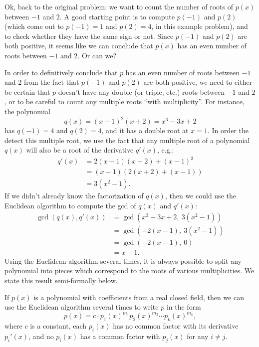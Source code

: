 Ok, back to the original problem: we want to count the number of roots of $p(x)$ between $-1$ and $2$. A good starting point is to compute $p(-1)$ and $p(2)$ (which come out to $p(-1) = 1$ and $p(2) = 4$, in this example problem), and to check whether they have the same sign or not. Since $p(-1)$ and $p(2)$ are both positive, it seems like we can conclude that $p(x)$ has an even number of roots between $-1$ and $2$. Or can we?

In order to definitively conclude that $p$ has an even number of roots between $-1$ and $2$ from the fact that $p(-1)$ and $p(2)$ are both positive, we need to either be certain that $p$ doesn't have any double (or triple, etc.) roots between $-1$ and $2$, or to be careful to count any multiple roots ``with multiplicity''. For instance, the polynomial
\[
q(x) = (x - 1)^2(x+2) = x^3 - 3x + 2
\]
has $q(-1) = 4$ and $q(2) = 4$, and it has a double root at $x = 1$. In order the detect this multiple root, we use the fact that any multiple root of a polynomial $q(x)$ will also be a root of the derivative $q'(x)$, e.g.:
\begin{align*}
q'(x) &= 2(x-1)(x+2) + (x-1)^2\\
&= (x-1)(2(x+2) + (x-1))\\
&= 3(x^2 - 1).
\end{align*}
If we didn't already know the factorization of $q(x)$, then we could use the Euclidean algorithm to compute the gcd of $q(x)$ and $q'(x)$:
\begin{align*}
\gcd(q(x), q'(x)) &= \gcd(x^3 - 3x + 2,\ 3(x^2 - 1))\\
&= \gcd(-2(x-1),\ 3(x^2 - 1))\\
&= \gcd(-2(x-1),\ 0)\\
&= x-1.
\end{align*}
Using the Euclidean algorithm several times, it is always possible to split any polynomial into pieces which correspond to the roots of various multiplicities. We state this result semi-formally below.

\begin{prop}\label{prop-poly-multiplicity} If $p(x)$ is a polynomial with coefficients from a real closed field, then we can use the Euclidean algorithm several times to write $p$ in the form
\[
p(x) = c\cdot p_1(x)^{m_1}p_2(x)^{m_2}\cdots p_k(x)^{m_k},
\]
where $c$ is a constant, each $p_i(x)$ has no common factor with its derivative $p_i'(x)$, and no $p_i(x)$ has a common factor with $p_j(x)$ for any $i \ne j$.
\end{prop}

